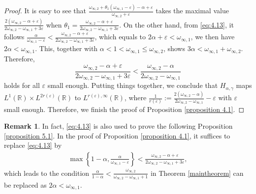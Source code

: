 \documentclass[11pt, twoside, leqno]{article}
\theoremstyle{definition}
\newtheorem{remark}[theorem]{Remark}
\numberwithin{equation}{section}
\begin{document}
\begin{proof}
It is easy to see that $\frac{\omega_{\infty,2}+ \theta_1(\omega_{\infty,1}-\varepsilon)-\alpha+\varepsilon}{\omega_{\infty,2}+\varepsilon}$ takes the maximal value $\frac{2(\omega_{\infty,2}-\alpha+\varepsilon)}{2\omega_{\infty,2}-\omega_{\infty,1}+3\varepsilon}$ when $\theta_1= \frac{\omega_{\infty,2}-\alpha+\varepsilon}{2\omega_{\infty,2}-\omega_{\infty,1}+3\varepsilon}$. On the other hand, from \eqref{eq:4.13}, it follows $\frac{\alpha}{\omega_{\infty,1}-\varepsilon}<\frac{\omega_{\infty,2}-\alpha+\varepsilon}{2\omega_{\infty,2}-\omega_{\infty,1}+3\varepsilon}$, which equals to $2\alpha+\varepsilon<\omega_{\infty,1}$, we then have $2\alpha<\omega_{\infty,1}$. This, together with $\alpha<1<\omega_{\infty,1}\leq\omega_{\infty,2}$, shows $3\alpha<\omega_{\infty,1}+\omega_{\infty,2}$. Therefore,
$$\frac{\omega_{\infty,2}-\alpha+\varepsilon}{2\omega_{\infty,2}-\omega_{\infty,1}+3\varepsilon}< \frac{\omega_{\infty,2}-\alpha}{2\omega_{\infty,2}-\omega_{\infty,1}}$$
holds for all $\varepsilon$ small enough. Putting things together, we conclude that $H_{\alpha,\gamma}$ maps $L^{1}(\mathbb{R})\times L^{2r( \varepsilon )   }(\mathbb{R})$ to $L^{r(\varepsilon ), \infty}(\mathbb{R})$, where $\frac{1}{r( \varepsilon ) }:=\frac{2(\omega_{\infty,2}-\alpha)}{2\omega_{\infty,2}-\omega_{\infty,1}}-\varepsilon $ with $\varepsilon$ small enough. Therefore, we finish the proof of Proposition \ref{proposition 4.1}.
\end{proof}

\begin{remark}\label{remark 4.2}
In fact, \eqref{eq:4.13} is also used to prove the following Proposition \ref{proposition 5.1}. In the proof of Proposition \ref{proposition 4.1}, it suffices to replace \eqref{eq:4.13} by
\begin{align*}
\max\left\{1-\alpha, \frac{\alpha}{\omega_{\infty,1}-\varepsilon}\right\}<\frac{\omega_{\infty,2}-\alpha+\varepsilon}{2\omega_{\infty,2}-\omega_{\infty,1}+3\varepsilon},
\end{align*}
which leads to the condition $\frac{\alpha}{1-\alpha}<\frac{\omega_{\infty,2}}{\omega_{\infty,2}-\omega_{\infty,1}+1}$ in Theorem \ref{maintheorem} can be replaced as $2\alpha<\omega_{\infty,1}$.
\end{remark}
\end{document}

